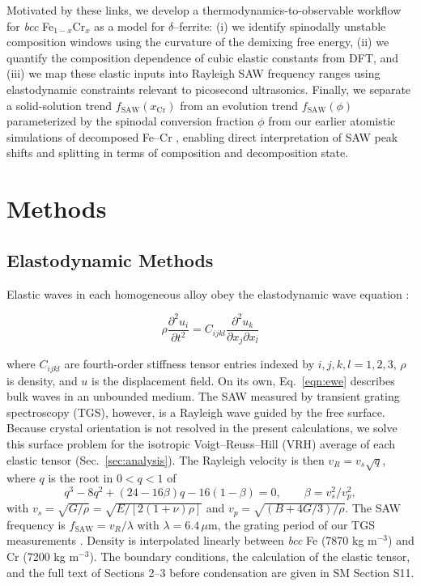 \documentclass[final,3p,times]{elsarticle}
\begin{document}
Motivated by these links, we develop a thermodynamics-to-observable workflow for \textit{bcc} Fe$_{1-x}$Cr$_x$ as a model for $\delta$--ferrite: (i) we identify spinodally unstable composition windows using the curvature of the demixing free energy, (ii) we quantify the composition dependence of cubic elastic constants from DFT, and (iii) we map these elastic inputs into Rayleigh SAW frequency ranges using elastodynamic constraints relevant to picosecond ultrasonics. Finally, we separate a solid-solution trend $f_{\mathrm{SAW}}(x_{\mathrm{Cr}})$ from an evolution trend $f_{\mathrm{SAW}}(\phi)$ parameterized by the spinodal conversion fraction $\phi$ from our earlier atomistic simulations of decomposed Fe--Cr \cite{al2023detecting}, enabling direct interpretation of SAW peak shifts and splitting in terms of composition and decomposition state.


\section{Methods}

\subsection{Elastodynamic Methods}
Elastic waves in each homogeneous alloy obey the elastodynamic wave equation \cite{du2017facile}:

\begin{equation}
    \rho \frac{\partial^2 u_i}{\partial t^2} = C_{ijkl} \frac{\partial^2 u_k}{\partial x_j \partial x_l}
    \label{eqn:ewe}
\end{equation}

where $C_{ijkl}$ are fourth-order stiffness tensor entries indexed by $i,j,k,l=1,2,3$, $\rho$ is density, and $u$ is the displacement field. On its own, Eq.~\ref{eqn:ewe} describes bulk waves in an unbounded medium. The SAW measured by transient grating spectroscopy (TGS), however, is a Rayleigh wave guided by the free surface. Because crystal orientation is not resolved in the present calculations, we solve this surface problem for the isotropic Voigt--Reuss--Hill (VRH) average of each elastic tensor (Sec.~\ref{sec:analysis}). The Rayleigh velocity is then $v_R = v_s\sqrt{q}$, where $q$ is the root in $0<q<1$ of
\begin{equation}
q^3 - 8q^2 + (24-16\beta)q - 16(1-\beta) = 0, \qquad \beta = v_s^2/v_p^2,
\label{eqn:rayleigh}
\end{equation}
with $v_s=\sqrt{G/\rho}=\sqrt{E/[2(1+\nu)\rho]}$ and $v_p=\sqrt{(B+4G/3)/\rho}$. The SAW frequency is $f_{\mathrm{SAW}} = v_R/\lambda$ with $\lambda = 6.4\,\mu$m, the grating period of our TGS measurements \cite{al2023detecting}. Density is interpolated linearly between \textit{bcc} Fe (7870 kg m$^{-3}$) and Cr (7200 kg m$^{-3}$). The boundary conditions, the calculation of the elastic tensor, and the full text of Sections 2--3 before condensation are given in SM Section S11.
\end{document}
